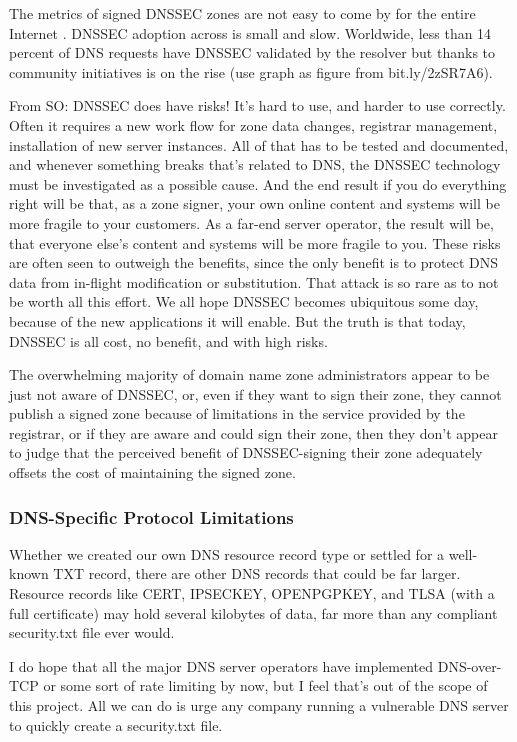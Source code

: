 The metrics of signed DNSSEC zones are not easy to come by for the entire
Internet \cite{APNIC}. DNSSEC adoption across is small and slow. Worldwide, less
than 14 percent of DNS requests have DNSSEC validated by the resolver
\cite{APNIC} but thanks to community initiatives is on the rise
\cite{Cloudflare} (use graph as figure from bit.ly/2zSR7A6).

From SO: DNSSEC does have risks! It's hard to use, and harder to use correctly.
Often it requires a new work flow for zone data changes, registrar management,
installation of new server instances. All of that has to be tested and
documented, and whenever something breaks that's related to DNS, the DNSSEC
technology must be investigated as a possible cause. And the end result if you
do everything right will be that, as a zone signer, your own online content and
systems will be more fragile to your customers. As a far-end server operator,
the result will be, that everyone else's content and systems will be more
fragile to you. These risks are often seen to outweigh the benefits, since the
only benefit is to protect DNS data from in-flight modification or substitution.
That attack is so rare as to not be worth all this effort. We all hope DNSSEC
becomes ubiquitous some day, because of the new applications it will enable. But
the truth is that today, DNSSEC is all cost, no benefit, and with high risks.

The overwhelming majority of domain name zone administrators appear to be just
not aware of DNSSEC, or, even if they want to sign their zone, they cannot
publish a signed zone because of limitations in the service provided by the
registrar, or if they are aware and could sign their zone, then they don’t
appear to judge that the perceived benefit of DNSSEC-signing their zone
adequately offsets the cost of maintaining the signed zone.

\subsubsection{DNS-Specific Protocol Limitations}

Whether we created our own DNS
resource record type or settled for a well-known TXT record, there are other DNS
records that could be far larger. Resource records like CERT, IPSECKEY,
OPENPGPKEY, and TLSA (with a full certificate) may hold several kilobytes of
data, far more than any compliant security.txt file ever would.

I do hope that all the major DNS server operators have implemented DNS-over-TCP
or some sort of rate limiting by now, but I feel that's out of the scope of this
project. All we can do is urge any company running a vulnerable DNS server to
quickly create a security.txt file.

